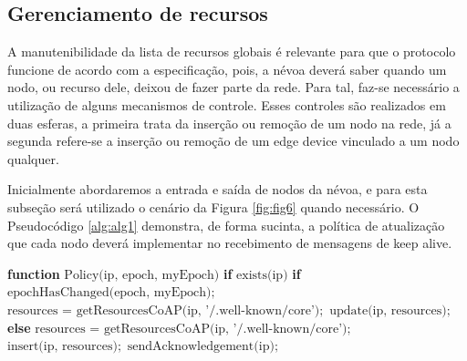 \subsection{Gerenciamento de recursos}

A manutenibilidade da lista de recursos globais é relevante para que o protocolo funcione de acordo com a especificação, pois, a névoa deverá saber quando um nodo, ou recurso dele, deixou de fazer parte da rede.
Para tal, faz-se necessário a utilização de alguns mecanismos de controle.
Esses controles são realizados em duas esferas, a primeira trata da inserção ou remoção de um nodo na rede,
já a segunda refere-se a inserção ou remoção de um edge device vinculado a um nodo qualquer.


Inicialmente abordaremos a entrada e saída de nodos da névoa, e para esta subseção será utilizado o cenário da Figura \ref{fig:fig6} quando necessário.
O Pseudocódigo \ref{alg:alg1} demonstra, de forma sucinta, a política de atualização que cada nodo deverá implementar no recebimento de mensagens de keep alive.


\begin{algorithm}[H]
    \begin{center}
        \begin{algorithmic}[1]
            \STATE \textbf{function} $\text{Policy(ip, epoch, myEpoch)}$
            \STATE \hspace{\algorithmicindent} \textbf{if} $\text{exists(ip)}$
            \STATE \hspace{\algorithmicindent} \hspace{\algorithmicindent} \textbf{if} $\text{epochHasChanged(epoch, myEpoch)};$
            \STATE \hspace{\algorithmicindent} \hspace{\algorithmicindent} \hspace{\algorithmicindent} $\text{resources = getResourcesCoAP(ip, '/.well-known/core')};$
            \STATE \hspace{\algorithmicindent} \hspace{\algorithmicindent} \hspace{\algorithmicindent} $\text{update(ip, resources)};$
            \STATE \hspace{\algorithmicindent} \textbf{else}
            \STATE \hspace{\algorithmicindent} \hspace{\algorithmicindent} $\text{resources = getResourcesCoAP(ip, '/.well-known/core')};$
            \STATE \hspace{\algorithmicindent} \hspace{\algorithmicindent} $\text{insert(ip, resources)};$
            \STATE \hspace{\algorithmicindent} $\text{sendAcknowledgement(ip)};$

        \end{algorithmic}
    \end{center}
    \caption[Política de atualização de recursos]%
        {\label{alg:alg1} Política de atualização de recursos.}%
    \end{algorithm}

